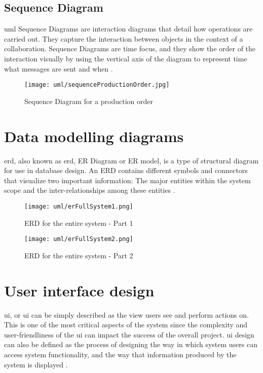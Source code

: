 \documentclass[12pt]{report}
\begin{document}
\newpage
\subsection{Sequence Diagram}
\acrshort{uml} Sequence Diagrams are interaction diagrams that detail how operations are carried out. They capture the interaction between objects in the context of a collaboration. Sequence Diagrams are time focus, and they show the order of the interaction visually by using the vertical axis of the diagram to represent time what messages are sent and when \cite{vparadigm_2018_uml}.

\begin{figure}[H]
	\centering
	\texttt{[image: uml/sequenceProductionOrder.jpg]}
	\caption{Sequence Diagram for a production order}
\end{figure}


\section{Data modelling diagrams}
\acrlong{erd}, also known as \acrshort{erd}, ER Diagram or ER model, is a type of structural diagram for use in database design. An ERD contains different symbols and connectors that visualize two important information: The major entities within the system scope and the inter-relationships among these entities \cite{vparadigm_2018_uml}.

\begin{figure}[H]
	\centering
	\texttt{[image: uml/erFullSystem1.png]}
	\caption{ERD for the entire system - Part 1}
\end{figure}

\begin{figure}[H]
	\centering
	\texttt{[image: uml/erFullSystem2.png]}
	\caption{ERD for the entire system - Part 2}
\end{figure}

\newpage
\section{User interface design}
\acrlong{ui}, or \acrshort{ui} can be simply described as the view users see and perform actions on. This is one of the most critical aspects of the system since the complexity and user-­friendliness of the \acrshort{ui} can impact the success of the overall project. \acrshort{ui} design can also be defined as the process of designing the way in which system users can access system functionality, and the way that information produced by the system is displayed \cite{sommerville_2008_se}.
\end{document}
